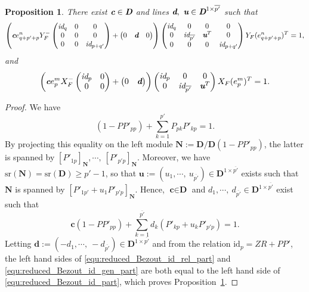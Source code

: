 \documentclass[10pt]{article}
\newtheorem{proposition}{Proposition}
\newcommand\g[1]{\textbf{#1}}
\newcommand\gth[1]{\emph{\g{#1}}}
\newcommand\id[1]{\text{id}_{#1}}
\newcommand\idd[1]{\emph{id}_{#1}}
\newcommand\sr[1]{\text{sr}\left(#1\right)}
\newcommand\D{\g{D}}
\begin{document}
\begin{proposition}\label{prop:reduced_Bezout_id_part}
  There exist $\gth{c}\in\gth{D}$ and lines $\gth{d},\ \gth{u}\in\gth{D}^
  {1\times\overline{p'}}$ such that
  \begin{equation}\label{equ:reduced_Bezout_id_rel_part}
    \left(\gth{c}e^n_{q+p'+p}Y_F^-\begin{pmatrix}
    \idd{q} & 0 & 0\\
    0 & 0 & 0\\
    0 & 0 & \idd{p+q'}
    \end{pmatrix}+\begin{pmatrix}
    0 & \gth{d} & 0
    \end{pmatrix}\right)\begin{pmatrix}
      \idd{q} & 0 & 0 & 0\\
      0 & \idd{\overline{p'}} & \gth{u}^T & 0\\
      0 & 0 & 0 & \idd{p+q'}
    \end{pmatrix}Y_F(e^{n}_{q+p'+p})^T=1,
  \end{equation}
  and
  \begin{equation}\label{equ:reduced_Bezout_id_gen_part}
    \left(\gth{c}e^m_pX_F^-\begin{pmatrix}
    \idd{p} & 0\\
    0 & 0
    \end{pmatrix}+\begin{pmatrix}
    0 & \gth{d}
    \end{pmatrix}\right)\begin{pmatrix}
      \idd{p} & 0 & 0\\
      0 & \idd{\overline{p'}} & \gth{u}^T
    \end{pmatrix}X_F(e^{m}_{p})^T=1.
  \end{equation}  
\end{proposition}

\begin{proof}
  We have
  \[
  \left(1-PP'_{pp}\right)+\sum_{k=1}^{p'}P_{pk}P'_{kp}=1.
  \]
  By projecting this equality on the left module $\g{N}:=\D/\D\left(1-
  PP'_{pp}\right)$, the latter is spanned by $[P'_{1p}]_{\g{N}},\cdots,\
  [P'_{p'p}]_{\g{N}}$. Moreover, we have $\sr{\g{N}}=\sr{\D}\geq p'-1$,
  so that $\g{u}:=\left(u_1,\cdots,\ u_{\overline{p'}}\right)\in\D^{1
    \times\overline{p'}}$ exists such that $\g{N}$ is spanned by $[P'_{1
      p'}+u_1P'_{p'p}]_{\g{N}}$. Hence, $\g{c}\in\D$ and $d_1,\cdots,\
  d_{\overline{p'}}\in\D^{1\times\overline{p'}}$ exist such that
  \begin{equation}\label{equ:reduced_Bezout_id_part}
    \g{c}\left(1-PP'_{pp}\right)+\sum_{k=1}^{\overline{p'}}d_k\left(P'_{k
      p}+u_kP'_{p'p}\right)=1.
  \end{equation}
  Letting $\g{d}:=\left( -d_1,\cdots,\ -d_{\overline{p'}}\right)\in\D^{1
    \times\overline{p'}}$ and from the relation $\id{p}=ZR+PP'$, the left
  hand sides of \eqref{equ:reduced_Bezout_id_rel_part} and
  \eqref{equ:reduced_Bezout_id_gen_part} are both equal to the left
  hand side of \eqref{equ:reduced_Bezout_id_part}, which proves
  Proposition~\ref{prop:reduced_Bezout_id_part}.
\end{proof}
\end{document}
